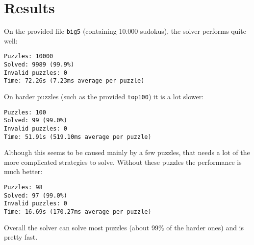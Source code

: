\documentclass[11pt, a4paper, fleqn]{article}
\begin{document}
\section{Results}
On the provided file \texttt{big5} (containing $10.000$ sudokus), the solver performs quite
well:
\begin{verbatim}
Puzzles: 10000
Solved: 9989 (99.9%)
Invalid puzzles: 0
Time: 72.26s (7.23ms average per puzzle)
\end{verbatim}

On harder puzzles (such as the provided \texttt{top100}) it is a lot slower:
\begin{verbatim}
Puzzles: 100
Solved: 99 (99.0%)
Invalid puzzles: 0
Time: 51.91s (519.10ms average per puzzle)
\end{verbatim}

Although this seems to be caused mainly by a few puzzles, that needs a lot of the
more complicated strategies to solve. Without these puzzles the performance is much
better:
\begin{verbatim}
Puzzles: 98
Solved: 97 (99.0%)
Invalid puzzles: 0
Time: 16.69s (170.27ms average per puzzle)
\end{verbatim}

Overall the solver can solve most puzzles (about 99\% of the harder ones) and is pretty
fast.
\end{document}

